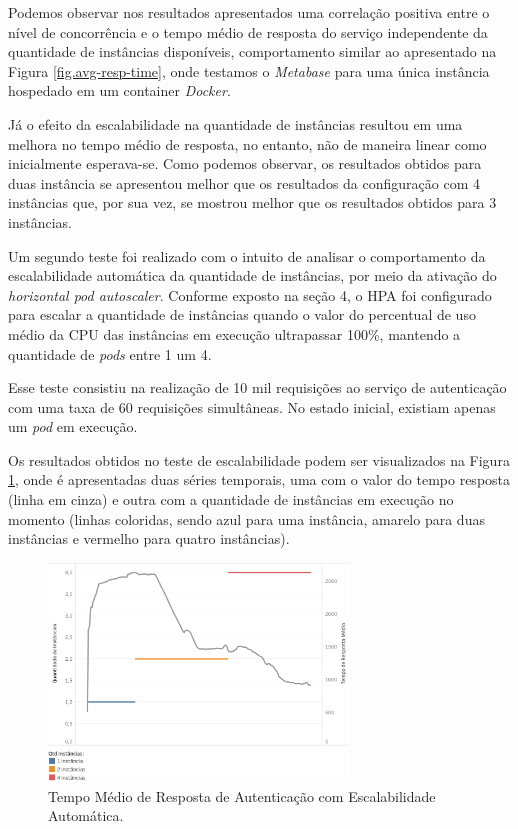 Podemos observar nos resultados apresentados uma correlação positiva entre o nível de concorrência e o tempo médio de resposta do serviço independente da quantidade de instâncias disponíveis, comportamento similar ao apresentado na Figura \ref{fig.avg-resp-time}, onde testamos o \textit{Metabase} para uma única instância hospedado em um container \textit{Docker}. 

Já o efeito da escalabilidade na quantidade de instâncias resultou em uma melhora no tempo médio de resposta, no entanto, não de maneira linear como inicialmente esperava-se. Como podemos observar, os resultados obtidos para duas instância se apresentou melhor que os resultados da configuração com 4 instâncias que, por sua vez, se mostrou melhor que os resultados obtidos para 3 instâncias. 

Um segundo teste foi realizado com o intuito de analisar o comportamento da escalabilidade automática da quantidade de instâncias, por meio da ativação do \textit{horizontal pod autoscaler}. Conforme exposto na seção 4, o HPA foi configurado para escalar a quantidade de instâncias quando o valor do percentual de uso médio da CPU das instâncias em execução ultrapassar 100\%, mantendo a quantidade de \textit{pods} entre 1 um 4. 

Esse teste consistiu na realização de 10 mil requisições ao serviço de autenticação com uma taxa de 60 requisições simultâneas. No estado inicial, existiam apenas um \textit{pod} em execução. 

Os resultados obtidos no teste de escalabilidade podem ser visualizados na Figura \ref{fig.avg-resp-time-hpa}, onde é apresentadas duas séries temporais, uma com o valor do tempo resposta (linha em cinza) e outra com a quantidade de instâncias em execução no momento (linhas coloridas, sendo azul para uma instância, amarelo para duas instâncias e vermelho para quatro instâncias).

\begin{figure}[htp]
   \centering
    \includegraphics[width=8cm]{Imagens/Performance-HPA}
    \caption{Tempo Médio de Resposta de Autenticação com Escalabilidade Automática.}
    \label{fig.avg-resp-time-hpa}
\end{figure} 

